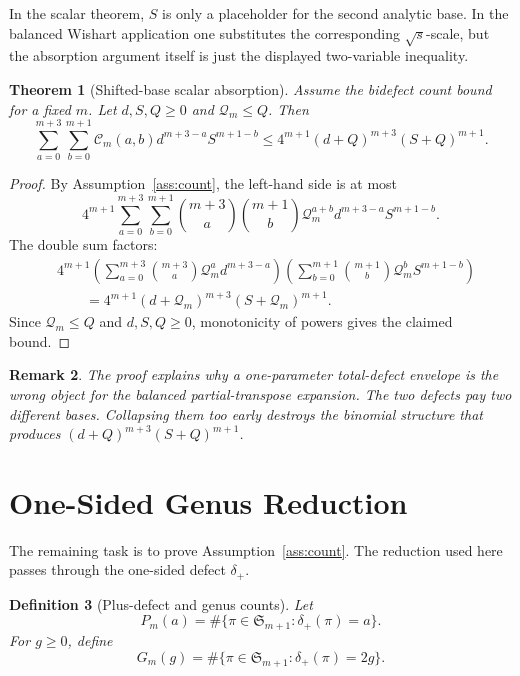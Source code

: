 \documentclass[11pt]{article}
\numberwithin{equation}{section}
\newtheorem{theorem}{Theorem}[section]
\newtheorem{definition}[theorem]{Definition}
\newtheorem{remark}[theorem]{Remark}
\newcommand{\Sym}{\mathfrak S}
\newcommand{\dplus}{\delta_+}
\newcommand{\Count}{\mathcal C}
\newcommand{\Qloss}{\mathcal Q}
\begin{document}
In the scalar theorem, \(S\) is only a placeholder for the second analytic
base.  In the balanced Wishart application one substitutes the corresponding
\(\sqrt{s}\)-scale, but the absorption argument itself is just the displayed
two-variable inequality.

\begin{theorem}[Shifted-base scalar absorption]\label{thm:scalar}
Assume the bidefect count bound for a fixed \(m\).  Let \(d,S,Q\ge0\) and
\(\Qloss_m\le Q\).  Then
\[
\sum_{a=0}^{m+3}\sum_{b=0}^{m+1}
  \Count_m(a,b)d^{m+3-a}S^{m+1-b}
  \le
  4^{m+1}(d+Q)^{m+3}(S+Q)^{m+1}.
\]
\end{theorem}

\begin{proof}
By Assumption~\ref{ass:count}, the left-hand side is at most
\[
  4^{m+1}
  \sum_{a=0}^{m+3}\sum_{b=0}^{m+1}
  \binom{m+3}{a}\binom{m+1}{b}
  \Qloss_m^{a+b}
  d^{m+3-a}S^{m+1-b}.
\]
The double sum factors:
\[
\begin{aligned}
&4^{m+1}
 \left(\sum_{a=0}^{m+3}
   \binom{m+3}{a}\Qloss_m^a d^{m+3-a}\right)
 \left(\sum_{b=0}^{m+1}
   \binom{m+1}{b}\Qloss_m^b S^{m+1-b}\right) \\
&\qquad =
4^{m+1}(d+\Qloss_m)^{m+3}(S+\Qloss_m)^{m+1}.
\end{aligned}
\]
Since \(\Qloss_m\le Q\) and \(d,S,Q\ge0\), monotonicity of powers gives the
claimed bound.
\end{proof}

\begin{remark}
The proof explains why a one-parameter total-defect envelope is the wrong
object for the balanced partial-transpose expansion.  The two defects pay two
different bases.  Collapsing them too early destroys the binomial structure
that produces \((d+Q)^{m+3}(S+Q)^{m+1}\).
\end{remark}

\section{One-Sided Genus Reduction}

The remaining task is to prove Assumption~\ref{ass:count}.  The reduction
used here passes through the one-sided defect \(\dplus\).

\begin{definition}[Plus-defect and genus counts]
Let
\[
  P_m(a)=\#\{\pi\in\Sym_{m+1}:\dplus(\pi)=a\}.
\]
For \(g\ge0\), define
\[
  G_m(g)=\#\{\pi\in\Sym_{m+1}:\dplus(\pi)=2g\}.
\]
\end{definition}
\end{document}
